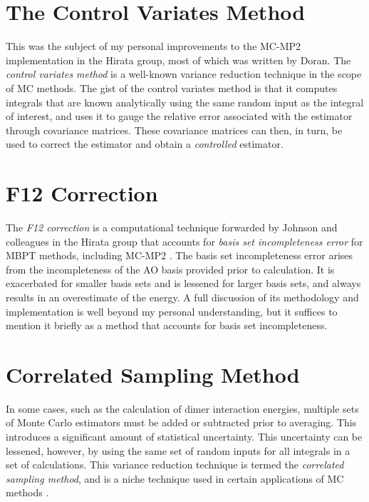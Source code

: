 \section{The Control Variates Method}
\label{s:cv}

This was the subject of my personal improvements to the MC-MP2 implementation in
the Hirata group, most of which was written by Doran. The \emph{control variates
method} is a well-known variance reduction technique in the scope of MC methods.
The gist of the control variates method is that it computes integrals that are
known analytically using the same random input as the integral of interest, and
uses it to gauge the relative error associated with the estimator through
covariance matrices. These covariance matrices can then, in turn, be used to
correct the estimator and obtain a \emph{controlled} estimator.

\section{F12 Correction}
\label{s:F12}

The \emph{F12 correction} is a computational technique forwarded by Johnson and
colleagues in the Hirata group that accounts for \emph{basis set incompleteness
error} for MBPT methods, including MC-MP2 \cite{willow1, f12-1, f12-2}. The
basis set incompleteness error arises from the incompleteness of the AO basis
provided prior to calculation. It is exacerbated for smaller basis sets and is
lessened for larger basis sets, and always results in an overestimate of the
energy. A full discussion of its methodology and implementation is well beyond
my personal understanding, but it suffices to mention it briefly as a method
that accounts for basis set incompleteness.

\section{Correlated Sampling Method}
\label{s:correlated}

In some cases, such as the calculation of dimer interaction energies, multiple
sets of Monte Carlo estimators must be added or subtracted prior to averaging.
This introduces a significant amount of statistical uncertainty. This
uncertainty can be lessened, however, by using the same set of random inputs for
all integrals in a set of calculations. This variance reduction technique is
termed the \emph{correlated sampling method}, and is a niche
technique used in certain applications of MC methods \cite{correlated-sampling}.

